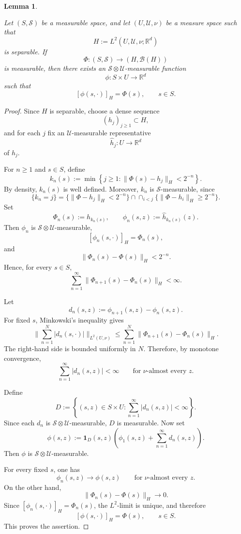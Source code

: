 \documentclass[12pt,oneside, reqno]{amsart}
\newtheorem{lemma}[theorem]{Lemma}
\numberwithin{equation}{section}
\begin{document}
	
	\begin{lemma}
		\label{lem:measurable-H-representative}
		
		
		Let \((S,\mathcal S)\) be a measurable space, and let
		\((U,\mathcal U,\nu)\) be a measure space such that
		\[
		H:=L^2(U,\mathcal U,\nu;\mathbb R^d)
		\]
		is separable. If
		\[
		\Phi:(S,\mathcal S)\longrightarrow(H,\mathcal B(H))
		\]
		is measurable, then there exists an
		\(\mathcal S\otimes\mathcal U\)-measurable function
		\[
		\phi:S\times U\longrightarrow\mathbb R^d
		\]
		such that
		\[
		[\phi(s,\cdot)]_H=\Phi(s),
		\qquad s\in S.
		\]
		
	\end{lemma}
	\begin{proof}
		Since \(H\) is separable, choose a dense sequence
		\[
		(h_j)_{j\geq1}\subset H,
		\]
		and for each \(j\) fix an \(\mathcal U\)-measurable representative
		\[
		\widehat h_j:U\longrightarrow\mathbb R^d
		\]
		of \(h_j\).
		
		For \(n\geq1\) and \(s\in S\), define
		\[
		k_n(s)
		:=
		\min\left\{
		j\geq1:
		\|\Phi(s)-h_j\|_H<2^{-n}
		\right\}.
		\]
		By density, \(k_n(s)\) is well defined. Moreover, \(k_n\) is
		\(\mathcal S\)-measurable, since
		\[
		\{k_n=j\}
		=
		\{\|\Phi-h_j\|_H<2^{-n}\}
		\cap
		\cap_{i<j}
		\{\|\Phi-h_i\|_H\geq2^{-n}\}.
		\]
		Set
		\[
		\Phi_n(s):=h_{k_n(s)},
		\qquad
		\phi_n(s,z):=\widehat h_{k_n(s)}(z).
		\]
		Then \(\phi_n\) is
		\(\mathcal S\otimes\mathcal U\)-measurable,
		\[
		[\phi_n(s,\cdot)]_H=\Phi_n(s),
		\]
		and
		\[
		\|\Phi_n(s)-\Phi(s)\|_H<2^{-n}.
		\]
		Hence, for every \(s\in S\),
		\[
		\sum_{n=1}^\infty
		\|\Phi_{n+1}(s)-\Phi_n(s)\|_H
		<\infty.
		\]
		
		Let
		\[
		d_n(s,z):=\phi_{n+1}(s,z)-\phi_n(s,z).
		\]
		For fixed \(s\), Minkowski's inequality gives
		\[
		\big\|
		\sum_{n=1}^N |d_n(s,\cdot)|
		\big\|_{L^2(U,\nu)}
		\leq
		\sum_{n=1}^N
		\|\Phi_{n+1}(s)-\Phi_n(s)\|_H.
		\]
		The right-hand side is bounded uniformly in \(N\). Therefore,
		by monotone convergence,
		\[
		\sum_{n=1}^\infty |d_n(s,z)|<\infty
		\qquad
		\text{for \(\nu\)-almost every }z.
		\]
		
		Define
		\[
		D
		:=
		\left\{
		(s,z)\in S\times U:
		\sum_{n=1}^\infty |d_n(s,z)|<\infty
		\right\}.
		\]
		Since each \(d_n\) is
		\(\mathcal S\otimes\mathcal U\)-measurable, \(D\) is measurable.
		Now set
		\[
		\phi(s,z)
		:=
		\mathbf1_D(s,z)
		\left(
		\phi_1(s,z)
		+
		\sum_{n=1}^\infty d_n(s,z)
		\right).
		\]
		Then \(\phi\) is
		\(\mathcal S\otimes\mathcal U\)-measurable.
		
		For every fixed \(s\), one has
		\[
		\phi_n(s,z)\longrightarrow\phi(s,z)
		\qquad
		\text{for \(\nu\)-almost every }z.
		\]
		On the other hand,
		\[
		\|\Phi_n(s)-\Phi(s)\|_H\longrightarrow0.
		\]
		Since \([\phi_n(s,\cdot)]_H=\Phi_n(s)\), the \(L^2\)-limit is unique,
		and therefore
		\[
		[\phi(s,\cdot)]_H=\Phi(s),
		\qquad s\in S.
		\]
		This proves the assertion.
	\end{proof}
	
\end{document}
